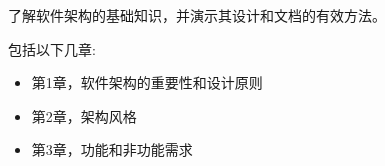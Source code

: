 
了解软件架构的基础知识，并演示其设计和文档的有效方法。

包括以下几章:

\begin{itemize}
\item 第1章，软件架构的重要性和设计原则
\item 第2章，架构风格
\item 第3章，功能和非功能需求
\end{itemize}